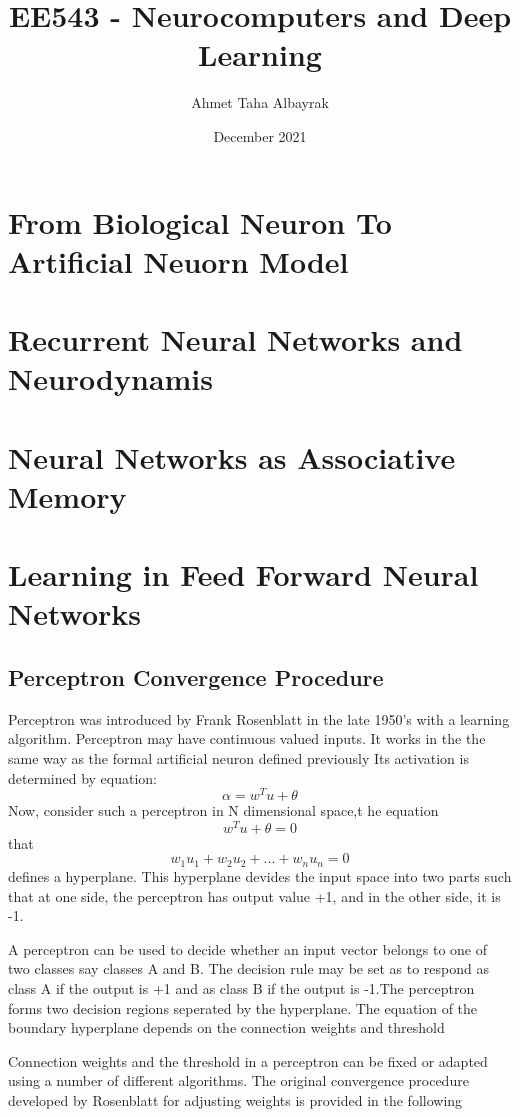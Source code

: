 \documentclass[12pt, a4paper, twoside]{book}
\title{EE543 - Neurocomputers and Deep Learning}
\author{Ahmet Taha Albayrak}
\date{December 2021}
\begin{document}
\begin{titlepage}
\maketitle
\end{titlepage}

\chapter{From Biological Neuron To Artificial Neuorn Model}
\chapter{Recurrent Neural Networks and Neurodynamis}
\chapter{Neural Networks as Associative Memory}

\chapter{Learning in Feed Forward Neural Networks}
\section{Perceptron Convergence Procedure}


Perceptron was introduced by Frank Rosenblatt in the late 1950's with a learning algorithm.
Perceptron may have continuous valued inputs.
It works in the the same way as the formal artificial neuron defined previously
Its activation is determined by equation:
\[\alpha= w^Tu+\theta \] 
Now, consider such a perceptron in N dimensional space,t he equation 
\[w^Tu + \theta = 0\] 
that 
\[w_1u_1 + w_2u_2 +...+w_nu_n=0\] defines a hyperplane. This hyperplane devides the input space into two parts
such that at one side, the perceptron has output value +1, and in the other side, it is -1.

A perceptron can be used to decide whether an input vector belongs to one of two classes say classes A and B.
The decision rule may be set as to respond as class A if the output is +1 and as class B if the output is -1.The perceptron forms two decision regions seperated by the hyperplane. The equation of the boundary hyperplane depends on the connection weights and threshold 

Connection weights and the threshold in a perceptron can be fixed or adapted using a number of different algorithms.
The original convergence procedure developed by Rosenblatt for adjusting weights is provided in the following
\pagebreak
\end{document}
